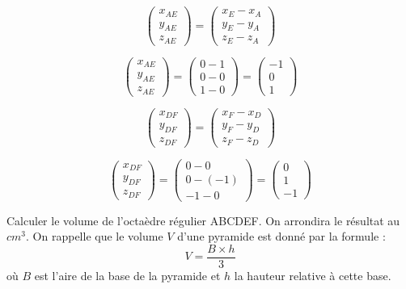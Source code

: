 \documentclass[answers]{exam}
\begin{document}
\begin{questions}
\begin{solution}
    \[
      \begin{pmatrix}
        x_{AE} \\
        y_{AE} \\ 
        z_{AE}
      \end{pmatrix}
      = 
      \begin{pmatrix}
        x_{E} - x_{A} \\
        y_{E} - y_{A} \\ 
        z_{E} - z_{A}
      \end{pmatrix}
    \]
    
    \[
      \begin{pmatrix}
        x_{AE} \\
        y_{AE} \\ 
        z_{AE}
      \end{pmatrix}
      = 
      \begin{pmatrix}
        0 - 1 \\
        0 - 0 \\ 
        1 - 0
      \end{pmatrix}
      = 
      \begin{pmatrix}
        - 1 \\
        0 \\ 
        1
      \end{pmatrix}
    \]
    
    \[
      \begin{pmatrix}
        x_{DF} \\
        y_{DF} \\ 
        z_{DF}
      \end{pmatrix}
      = 
      \begin{pmatrix}
        x_{F} - x_{D} \\
        y_{F} - y_{D} \\ 
        z_{F} - z_{D}
      \end{pmatrix}
    \]
    
    \[
      \begin{pmatrix}
        x_{DF} \\
        y_{DF} \\ 
        z_{DF}
      \end{pmatrix}
      = 
      \begin{pmatrix}
        0 - 0 \\
        0 - (-1) \\ 
        -1 - 0
      \end{pmatrix}
      = 
      \begin{pmatrix}
        0 \\
        1 \\ 
        -1
      \end{pmatrix}
    \]
  \end{solution}
  \question[1] Calculer le volume de l'octaèdre régulier ABCDEF. On arrondira le résultat au $cm^3$. On rappelle que le volume $V$ d'une pyramide est donné par la formule :
 \[
  V = \frac{B \times h}{3}
  \]
  où $B$ est l'aire de la base de la pyramide et $h$ la hauteur relative à cette base.
  \begin{solution}
    

\end{solution}
\end{questions}
\end{document}
